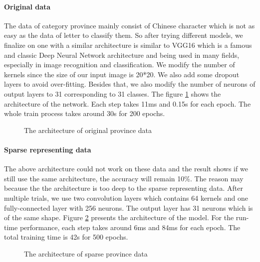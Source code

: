 \paragraph{Original data} %
The data of category province mainly consist of Chinese character which is not as easy as 
the data of letter to classify them. So after trying different models, we finalize on one 
with a similar architecture is similar to VGG16 \cite{simonyan2014very} which is a famous 
and classic Deep Neural Network architecture and being used in many fields, 
especially in image recognition and classification. We modify the number of kernels since 
the size of our input image is 20*20. We also add some dropout layers to avoid over-fitting. 
Besides that, we also modify the number of neurons of output layers to 31 corresponding to 
31 classes. The figure \ref{original_province_architecture} shows the architecture of the 
network. Each step takes 11ms and 0.15s for each epoch. 
The whole train process takes around 30s for 200 epochs.

\begin{figure}[ht]
\centering
{}
\qquad
{}
\qquad
{}
\qquad
\caption{The architecture of original province data}
\label{original_province_architecture}
\end{figure}

\paragraph{Sparse representing data}
The above architecture could not work on these data and the 
result shows if we still use the same architecture, the accuracy will remain 10\%.
The reason may because the the architecture is too deep to the sparse representing data.
After multiple trials, we use two convolution layers which contains 64 kernels and one 
fully-connected layer with 256 neurons. 
The output layer has 31 neurons which is of the same shape.
Figure \ref{ar_pro_sparse} presents the architecture of the model. For the run-time 
performance, each step takes around 6ms and 84ms for each epoch. 
The total training time is 42s for 500 epochs.

\begin{figure}[ht]
\centering
{}
\qquad
{}
\qquad
\caption{The architecture of sparse province data}
\label{ar_pro_sparse}
\end{figure}

